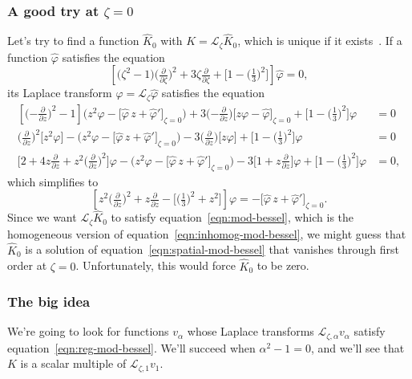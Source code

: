 \documentclass{article}
\theoremstyle{plain}
\newcommand{\laplace}{\mathcal{L}}
\begin{document}
\subsubsection{A good try at $\zeta = 0$}
Let's try to find a function $\hat{K}_0$ with $K = \laplace_\zeta \hat{K}_0$, which is unique if it exists~\cite[Theorem~1.23]{laplace-tfm}. If a function $\hat{\varphi}$ satisfies the equation
\begin{equation}%
\left[\big(\zeta^2 - 1\big) \big(\tfrac{\partial}{\partial \zeta}\big)^2 + 3\zeta \tfrac{\partial}{\partial \zeta} + \big[1 - \big(\tfrac{1}{3}\big)^2\big]\right] \hat{\varphi} = 0,
\end{equation}
its Laplace transform $\varphi = \laplace_\zeta \hat{\varphi}$ satisfies the equation
\begin{align*}
\left[\big({-\tfrac{\partial}{\partial z}}\big)^2 - 1\right] \Big(z^2 \varphi - \big[\hat{\varphi}\,z + \hat{\varphi}'\big]_{\zeta = 0}\Big) + 3\big({-\tfrac{\partial}{\partial z}}\big)\big[z\varphi - \hat{\varphi}\big]_{\zeta = 0} + \big[1 - \big(\tfrac{1}{3}\big)^2\big] \varphi & = 0 \\
\big(\tfrac{\partial}{\partial z}\big)^2 \big[z^2 \varphi\big] - \Big(z^2 \varphi - \big[\hat{\varphi}\,z + \hat{\varphi}'\big]_{\zeta = 0}\Big) - 3\big(\tfrac{\partial}{\partial z}\big)\big[z\varphi\big] + \big[1 - \big(\tfrac{1}{3}\big)^2\big] \varphi & = 0 \\
\Big[2 + 4z\tfrac{\partial}{\partial z} + z^2\big(\tfrac{\partial}{\partial z}\big)^2\Big]\varphi - \Big(z^2 \varphi - \big[\hat{\varphi}\,z + \hat{\varphi}'\big]_{\zeta = 0}\Big) - 3\Big[1 + z\tfrac{\partial}{\partial z}\Big]\varphi + \big[1 - \big(\tfrac{1}{3}\big)^2\big] \varphi & = 0,
\end{align*}
which simplifies to
\begin{equation}\label{eqn:inhomog-mod-bessel}
\left[z^2 \big(\tfrac{\partial}{\partial z}\big)^2 + z \tfrac{\partial}{\partial z} - \big[\big(\tfrac{1}{3}\big)^2 + z^2\big]\right] \varphi = -\big[\hat{\varphi}\,z + \hat{\varphi}'\big]_{\zeta = 0}.
\end{equation}
Since we want $\laplace_\zeta \hat{K}_0$ to satisfy equation~\ref{eqn:mod-bessel}, which is the homogeneous version of equation~\ref{eqn:inhomog-mod-bessel}, we might guess that $\hat{K}_0$ is a solution of equation~\ref{eqn:spatial-mod-bessel} that vanishes through first order at $\zeta = 0$. Unfortunately, this would force $\hat{K}_0$ to be zero.
\color{black}
\subsubsection{The big idea}\label{big-idea}
We're going to look for functions $v_\alpha$ whose Laplace transforms $\laplace_{\zeta, \alpha} v_\alpha$ satisfy equation~\ref{eqn:reg-mod-bessel}. We'll succeed when $\alpha^2 - 1 = 0$, and we'll see that $K$ is a scalar multiple of $\laplace_{\zeta, 1} v_1$.
\end{document}
